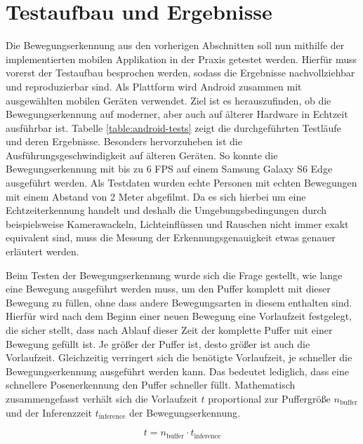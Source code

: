 \section{Testaufbau und Ergebnisse}
Die Bewegungserkennung aus den vorherigen Abschnitten soll nun mithilfe der
implementierten mobilen Applikation in der Praxis getestet werden. Hierfür muss
vorerst der Testaufbau besprochen werden, sodass die Ergebnisse nachvollziehbar
und reproduzierbar sind. Als Plattform wird Android zusammen mit ausgewählten
mobilen Geräten verwendet. Ziel ist es herauszufinden, ob die Bewegungserkennung
auf moderner, aber auch auf älterer Hardware in Echtzeit ausführbar ist. Tabelle
\ref{table:android-tests} zeigt die durchgeführten Testläufe und deren
Ergebnisse. Besonders hervorzuheben ist die Ausführungsgeschwindigkeit auf
älteren Geräten. So konnte die Bewegungserkennung mit bis zu 6 FPS auf einem
Samsung Galaxy S6 Edge ausgeführt werden. Als Testdaten wurden echte Personen
mit echten Bewegungen mit einem Abstand von 2 Meter abgefilmt. Da es sich
hierbei um eine Echtzeiterkennung handelt und deshalb die Umgebungsbedingungen
durch beispielsweise Kamerawackeln, Lichteinflüssen und Rauschen nicht immer
exakt equivalent sind, muss die Messung der Erkennungsgenauigkeit etwas genauer
erläutert werden.

Beim Testen der Bewegungserkennung wurde sich die Frage gestellt, wie lange
eine Bewegung ausgeführt werden muss, um den Puffer komplett mit dieser
Bewegung zu füllen, ohne dass andere Bewegungsarten in diesem enthalten sind.
Hierfür wird nach dem Beginn einer neuen Bewegung eine Vorlaufzeit festgelegt,
die sicher stellt, dass nach Ablauf dieser Zeit der komplette Puffer mit einer
Bewegung gefüllt ist. Je größer der Puffer ist, desto größer ist auch die
Vorlaufzeit. Gleichzeitig verringert sich die benötigte Vorlaufzeit, je
schneller die Bewegungserkennung ausgeführt werden kann. Das bedeutet
lediglich, dass eine schnellere Posenerkennung den Puffer schneller füllt.
Mathematisch zusammengefasst verhält sich die Vorlaufzeit $t$ proportional zur
Puffergröße $n_\mathrm{buffer}$ und der Inferenzzeit $t_\mathrm{inference}$ der
Bewegungserkennung.

\begin{equation}\label{eq:preruntime}
  t = n_\mathrm{buffer} \cdot t_\mathrm{inference}
\end{equation}

